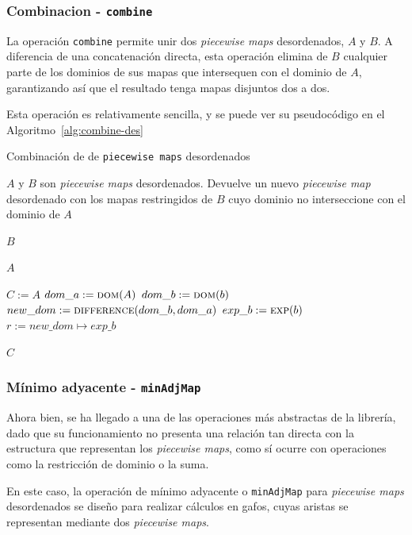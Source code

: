 \subsubsection{Combinacion - \texttt{combine}}

La operación \texttt{combine} permite unir dos \textit{piecewise maps} desordenados, $A$ y $B$. A diferencia de una concatenación directa, esta operación elimina de $B$ cualquier parte de los dominios de sus mapas que intersequen con el dominio de $A$, garantizando así que el resultado tenga mapas disjuntos dos a dos.

Esta operación es relativamente sencilla, y se puede ver su pseudocódigo en el Algoritmo~\ref{alg:combine-des}

\begin{algorithm}
\caption{Combinación de de \texttt{piecewise maps} desordenados}
\label{alg:combine-des}
\begin{algorithmic}[1]
\Require $A$ y $B$ son \textit{piecewise maps} desordenados. 
\Ensure Devuelve un nuevo \textit{piecewise map} desordenado con los mapas restringidos de $B$ cuyo dominio no interseccione con el dominio de $A$

    \State \Return $B$
  \EndIf

    \State \Return $A$
  \EndIf

  \State $C := A$ 
  \State $dom\_a := \Call{dom}{A}$
    \State $dom\_b := \Call{dom}{b}$
    \State $new\_dom := \Call{difference}{dom\_b, dom\_a}$
    \State $exp\_b := \Call{exp}{b}$
    \State $r := new\_dom \mapsto exp\_b$
    \State {}
  \EndFor

  \State \Return $C$
\EndFunction
\end{algorithmic}
\end{algorithm}

\subsubsection{Mínimo adyacente - \texttt{minAdjMap}}

Ahora bien, se ha llegado a una de las operaciones más abstractas de la librería, dado que su funcionamiento no presenta una relación tan directa con la estructura que representan los \textit{piecewise maps}, como sí ocurre con operaciones como la restricción de dominio o la suma.

En este caso, la operación de mínimo adyacente o \texttt{minAdjMap} para \textit{piecewise maps} desordenados se diseño para realizar cálculos en gafos, cuyas aristas se representan mediante dos \textit{piecewise maps}.

